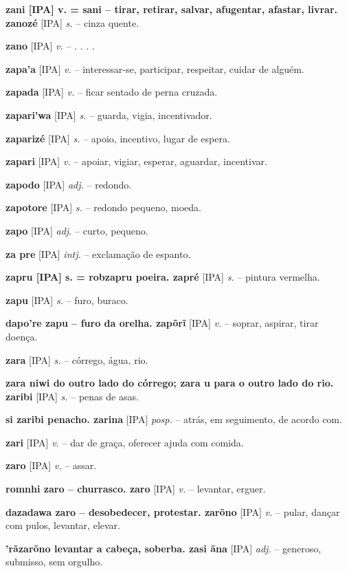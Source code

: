 {{{{{\textbf{zani [IPA] v. = sani -- tirar, retirar, salvar, afugentar, afastar, livrar. zanozé} [IPA] \textit{s.} -- cinza quente.

\textbf{zano} [IPA] \textit{v.} -- . . . .

\textbf{zapa'a} [IPA] \textit{v.} -- interessar-se, participar, respeitar, cuidar de alguém.

\textbf{zapada} [IPA] \textit{v.} -- ficar sentado de perna cruzada.

\textbf{zapari'wa} [IPA] \textit{s.} -- guarda, vigia, incentivador.

\textbf{zaparizé} [IPA] \textit{s.} -- apoio, incentivo, lugar de espera.

\textbf{zapari} [IPA] \textit{v.} -- apoiar, vigiar, esperar, aguardar, incentivar.

\textbf{zapodo} [IPA] \textit{adj.} -- redondo.

\textbf{zapotore} [IPA] \textit{s.} -- redondo pequeno, moeda.

\textbf{zapo} [IPA] \textit{adj.} -- curto, pequeno.

\textbf{za pre} [IPA] \textit{intj.} -- exclamação de espanto.

\textbf{zapru [IPA] s. = robzapru poeira. zapré} [IPA] \textit{s.} -- pintura vermelha.

\textbf{zapu} [IPA] \textit{s.} -- furo, buraco.

\textbf{dapo're zapu -- furo da orelha. zapõrĩ} [IPA] \textit{v.} -- soprar, aspirar, tirar doença.

\textbf{zara} [IPA] \textit{s.} -- córrego, água, rio.

\textbf{zara niwi do outro lado do córrego;  zara u para o outro lado do rio. zaribi} [IPA] \textit{s.} -- penas de asas.

\textbf{si zaribi penacho. zarina} [IPA] \textit{posp.} -- atrás, em seguimento, de acordo com.

\textbf{zari} [IPA] \textit{v.} -- dar de graça, oferecer ajuda com comida.

\textbf{zaro} [IPA] \textit{v.} -- assar.

\textbf{romnhi zaro -- churrasco. zaro} [IPA] \textit{v.} -- levantar, erguer.

\textbf{dazadawa zaro -- desobedecer, protestar. zarõno} [IPA] \textit{v.} -- pular, dançar com pulos, levantar, elevar.

\textbf{'rãzarõno levantar a cabeça, soberba. zasi ãna} [IPA] \textit{adj.} -- generoso, submisso, sem orgulho.

}}}}}
